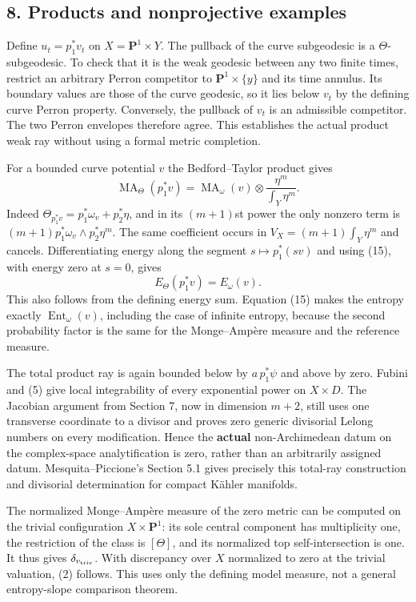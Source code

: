 \documentclass[
]{article}
\begin{document}
\subsection{8. Products and nonprojective
examples}\label{products-and-nonprojective-examples}

Define \(u_t=p_1^*v_t\) on \(X=\mathbf P^1\times Y\). The pullback of
the curve subgeodesic is a \(\Theta\)-subgeodesic. To check that it is
the weak geodesic between any two finite times, restrict an arbitrary
Perron competitor to \(\mathbf P^1\times\{y\}\) and its time annulus.
Its boundary values are those of the curve geodesic, so it lies below
\(v_t\) by the defining curve Perron property. Conversely, the pullback
of \(v_t\) is an admissible competitor. The two Perron envelopes
therefore agree. This establishes the actual product weak ray without
using a formal metric completion.

For a bounded curve potential \(v\) the Bedford--Taylor product gives \[
 \operatorname{MA}_\Theta(p_1^*v)
 =\operatorname{MA}_\omega(v)\otimes\frac{\eta^m}{\int_Y\eta^m}.
 \tag{15}
\] Indeed \(\Theta_{p_1^*v}=p_1^*\omega_v+p_2^*\eta\), and in its
\((m+1)\)st power the only nonzero term is
\((m+1)p_1^*\omega_v\wedge p_2^*\eta^m\). The same coefficient occurs in
\(V_X=(m+1)\int_Y\eta^m\) and cancels. Differentiating energy along the
segment \(s\mapsto p_1^*(sv)\) and using (15), with energy zero at
\(s=0\), gives \[
 E_\Theta(p_1^*v)=E_\omega(v).
 \tag{16}
\] This also follows from the defining energy sum. Equation (15) makes
the entropy exactly \(\operatorname{Ent}_\omega(v)\), including the case
of infinite entropy, because the second probability factor is the same
for the Monge--Ampère measure and the reference measure.

The total product ray is again bounded below by \(a\,p_1^*\psi\) and
above by zero. Fubini and (5) give local integrability of every
exponential power on \(X\times D\). The Jacobian argument from Section
7, now in dimension \(m+2\), still uses one transverse coordinate to a
divisor and proves zero generic divisorial Lelong numbers on every
modification. Hence the \textbf{actual} non-Archimedean datum on the
complex-space analytification is zero, rather than an arbitrarily
assigned datum. Mesquita--Piccione's Section 5.1 gives precisely this
total-ray construction and divisorial determination for compact Kähler
manifolds.

The normalized Monge--Ampère measure of the zero metric can be computed
on the trivial configuration \(X\times\mathbf P^1\): its sole central
component has multiplicity one, the restriction of the class is
\([\Theta]\), and its normalized top self-intersection is one. It thus
gives \(\delta_{v_{\rm triv}}\). With discrepancy over \(X\) normalized
to zero at the trivial valuation, (2) follows. This uses only the
defining model measure, not a general entropy-slope comparison theorem.
\end{document}
